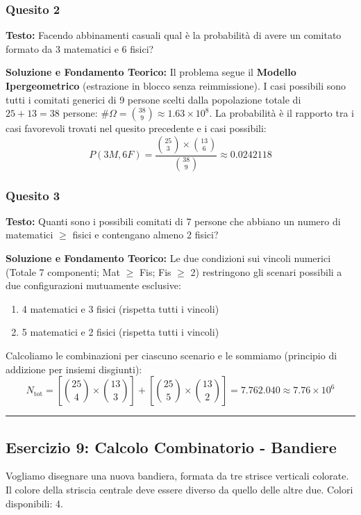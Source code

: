 \documentclass[12pt, a4paper]{article}
\begin{document}
\subsubsection*{Quesito 2}
\textbf{Testo:} Facendo abbinamenti casuali qual è la probabilità di avere un comitato formato da 3 matematici e 6 fisici?

\textbf{Soluzione e Fondamento Teorico:} 
Il problema segue il \textbf{Modello Ipergeometrico} (estrazione in blocco senza reimmissione).
I casi possibili sono tutti i comitati generici di 9 persone scelti dalla popolazione totale di $25 + 13 = 38$ persone: $\#\Omega = \binom{38}{9} \approx 1.63 \times 10^8$.
La probabilità è il rapporto tra i casi favorevoli trovati nel quesito precedente e i casi possibili:
$$ P(3M, 6F) = \frac{\binom{25}{3} \times \binom{13}{6}}{\binom{38}{9}} \approx 0.0242118 $$

\subsubsection*{Quesito 3}
\textbf{Testo:} Quanti sono i possibili comitati di 7 persone che abbiano un numero di matematici $\ge$ fisici e contengano almeno 2 fisici?

\textbf{Soluzione e Fondamento Teorico:} 
Le due condizioni sui vincoli numerici (Totale 7 componenti; Mat $\ge$ Fis; Fis $\ge$ 2) restringono gli scenari possibili a due configurazioni mutuamente esclusive:
\begin{enumerate}
    \item 4 matematici e 3 fisici (rispetta tutti i vincoli)
    \item 5 matematici e 2 fisici (rispetta tutti i vincoli)
\end{enumerate}
Calcoliamo le combinazioni per ciascuno scenario e le sommiamo (principio di addizione per insiemi disgiunti):
$$ N_{\text{tot}} = \left[\binom{25}{4} \times \binom{13}{3}\right] + \left[\binom{25}{5} \times \binom{13}{2}\right] = 7.762.040 \approx 7.76 \times 10^6 $$

\vspace{0.5cm}\hrule\vspace{0.5cm}

\subsection*{Esercizio 9: Calcolo Combinatorio - Bandiere}
Vogliamo disegnare una nuova bandiera, formata da tre strisce verticali colorate. Il colore della striscia centrale deve essere diverso da quello delle altre due. Colori disponibili: 4.
\end{document}
